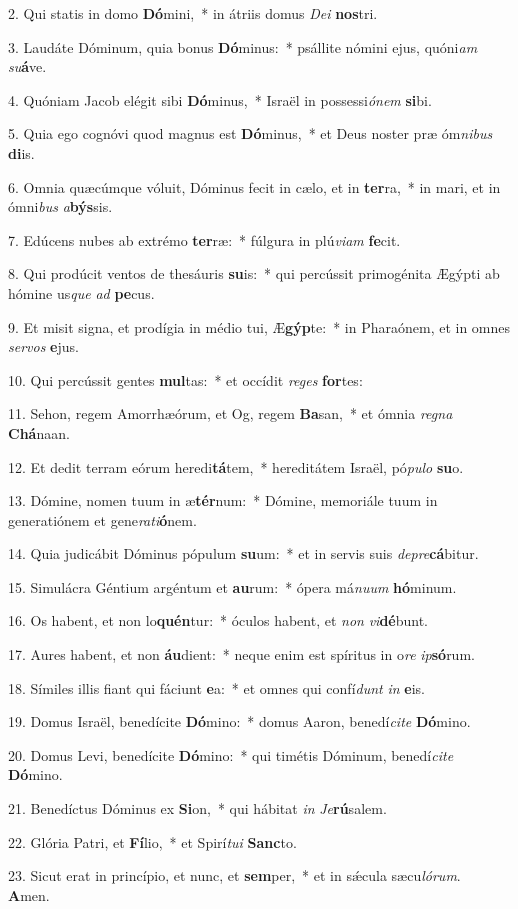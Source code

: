 2. Qui statis in domo \textbf{Dó}mini,~*  in átriis domus \textit{De}\textit{i} \textbf{nos}tri.\

3. Laudáte Dóminum, quia bonus \textbf{Dó}minus:~*  psállite nómini ejus, quóni\textit{am} \textit{su}\textbf{á}ve.\

4. Quóniam Jacob elégit sibi \textbf{Dó}minus,~*  Israël in possessi\textit{ó}\textit{nem} \textbf{si}bi.\

5. Quia ego cognóvi quod magnus est \textbf{Dó}minus,~*  et Deus noster præ óm\textit{ni}\textit{bus} \textbf{di}is.\

6. Omnia quæcúmque vóluit, Dóminus fecit in cælo, et in \textbf{ter}ra,~*  in mari, et in ómni\textit{bus} \textit{a}\textbf{býs}sis.\

7. Edúcens nubes ab extrémo \textbf{ter}ræ:~*  fúlgura in plú\textit{vi}\textit{am} \textbf{fe}cit.\

8. Qui prodúcit ventos de thesáuris \textbf{su}is:~*  qui percússit primogénita Ægýpti ab hómine us\textit{que} \textit{ad} \textbf{pe}cus.\

9. Et misit signa, et prodígia in médio tui, Æ\textbf{gýp}te:~*  in Pharaónem, et in omnes \textit{ser}\textit{vos} \textbf{e}jus.\

10. Qui percússit gentes \textbf{mul}tas:~*  et occídit \textit{re}\textit{ges} \textbf{for}tes:\

11. Sehon, regem Amorrhæórum, et Og, regem \textbf{Ba}san,~*  et ómnia \textit{re}\textit{gna} \textbf{Chá}naan.\

12. Et dedit terram eórum heredi\textbf{tá}tem,~*  hereditátem Israël, pó\textit{pu}\textit{lo} \textbf{su}o.\

13. Dómine, nomen tuum in æ\textbf{tér}num:~*  Dómine, memoriále tuum in generatiónem et gene\textit{ra}\textit{ti}\textbf{ó}nem.\

14. Quia judicábit Dóminus pópulum \textbf{su}um:~*  et in servis suis \textit{de}\textit{pre}\textbf{cá}bitur.\

15. Simulácra Géntium argéntum et \textbf{au}rum:~*  ópera má\textit{nu}\textit{um} \textbf{hó}minum.\

16. Os habent, et non lo\textbf{quén}tur:~*  óculos habent, et \textit{non} \textit{vi}\textbf{dé}bunt.\

17. Aures habent, et non \textbf{áu}dient:~*  neque enim est spíritus in o\textit{re} \textit{ip}\textbf{só}rum.\

18. Símiles illis fiant qui fáciunt \textbf{e}a:~*  et omnes qui confí\textit{dunt} \textit{in} \textbf{e}is.\

19. Domus Israël, benedícite \textbf{Dó}mino:~*  domus Aaron, benedí\textit{ci}\textit{te} \textbf{Dó}mino.\

20. Domus Levi, benedícite \textbf{Dó}mino:~*  qui timétis Dóminum, benedí\textit{ci}\textit{te} \textbf{Dó}mino.\

21. Benedíctus Dóminus ex \textbf{Si}on,~*  qui hábitat \textit{in} \textit{Je}\textbf{rú}salem.\

22. Glória Patri, et \textbf{Fí}lio,~*  et Spirí\textit{tu}\textit{i} \textbf{Sanc}to.\

23. Sicut erat in princípio, et nunc, et \textbf{sem}per,~*  et in sǽcula sæcu\textit{ló}\textit{rum}. \textbf{A}men.\


